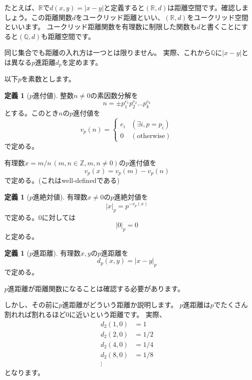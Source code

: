 \documentclass[uplatex]{jsarticle}
\newcommand{\Z}{\mathbb{Z}}
\newcommand{\Q}{\mathbb{Q}}
\newcommand{\R}{\mathbb{R}}
\theoremstyle{definition} %
\newtheorem{defi}[thm]{定義}
\begin{document}
たとえば、$\R$で$d(x, y) = |x - y|$と定義すると$(\R, d)$は距離空間です。確認しましょう。この距離関数$d$をユークリッド距離といい、$(\R, d)$をユークリッド空間といいます。
ユークリッド距離関数を有理数に制限した関数も$d$と書くことにすると$(\Q, d)$も距離空間です。

同じ集合でも距離の入れ方は一つとは限りません。
実際、これから$\Q$に$|x - y|$とは異なる$p$進距離$d_p$を定めます。

以下$p$を素数とします。

\begin{oframed}\begin{defi}[$p$進付値]
整数$n \ne 0$の素因数分解を
\[n = \pm p_1^{e_1} p_2^{e_2} \dots p_k^{e_k}\]
とする。このとき$n$の$p$進付値を
\[v_p(n) = \begin{cases}e_i & (\exists i, p = p_i) \\ 0 & (\text{otherwise}) \end{cases} \]
で定める。

有理数$x = m/n\,(m,n \in \Z, m, n \ne 0)$の$p$進付値を
\[v_p(x) = v_p(m) - v_p(n)\]
で定める。(これはwell-definedである)
\end{defi}\end{oframed}

\begin{oframed}\begin{defi}[$p$進絶対値]
有理数$x \ne 0$の$p$進絶対値を
\[|x|_p = p^{-v_p(x)}\]
で定める。$0$に対しては
\[|0|_p = 0\]
と定める。
\end{defi}\end{oframed}

\begin{oframed}\begin{defi}[$p$進距離]
有理数$x, y$の$p$進距離を
\[d_p(x, y) = |x - y|_p\]
で定める。
\end{defi}\end{oframed}

$p$進距離が距離関数になることは確認する必要があります。

しかし、その前に$p$進距離がどういう距離か説明します。
$p$進距離は$p$でたくさん割れれば割れるほど$0$に近いという距離です。
実際、
\begin{align*}
d_2(1, 0) &= 1 \\
d_2(2, 0) &= 1/2 \\
d_2(4, 0) &= 1/4 \\
d_2(8, 0) &= 1/8 \\
\vdots
\end{align*}
となります。
\end{document}

